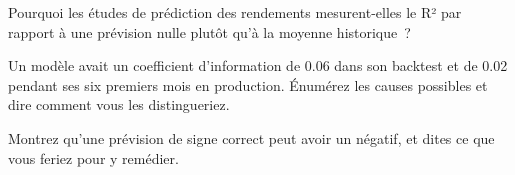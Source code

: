 \begin{interviewq}\label{iq:ml:why-financial-machine-learning-is-different:4}
Pourquoi les études de prédiction des rendements mesurent-elles le R² par rapport à une prévision nulle plutôt qu'à la moyenne historique~?
\end{interviewq}

\begin{interviewq}\label{iq:ml:why-financial-machine-learning-is-different:5}
Un modèle avait un coefficient d'information de 0.06 dans son backtest et de 0.02 pendant ses six premiers mois en production. Énumérez les
causes possibles et dire comment vous les distingueriez.
\end{interviewq}

\begin{interviewq}\label{iq:ml:why-financial-machine-learning-is-different:6}
Montrez qu'une prévision de signe correct peut avoir un  négatif, et dites ce que vous feriez pour y remédier.
\end{interviewq}
